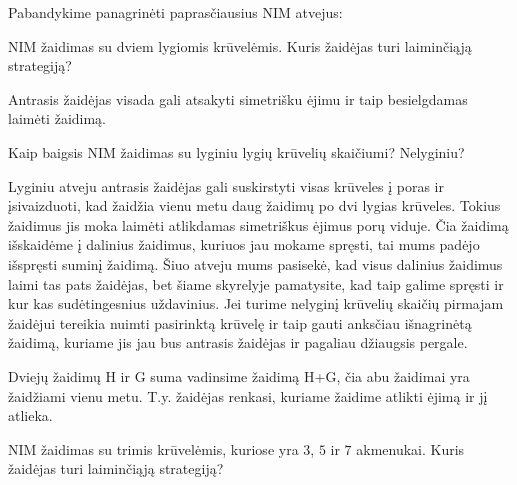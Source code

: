 Pabandykime panagrinėti paprasčiausius NIM atvejus:

\begin{pavnr}
NIM žaidimas su dviem lygiomis krūvelėmis. Kuris žaidėjas turi laiminčiąją strategiją?
\end{pavnr}

\begin{sprendimas}
Antrasis žaidėjas visada gali atsakyti simetrišku ėjimu ir taip besielgdamas laimėti žaidimą.
\end{sprendimas}

\begin{pavnr}
 Kaip baigsis NIM žaidimas su lyginiu lygių krūvelių skaičiumi? Nelyginiu? 
\end{pavnr}

\begin{sprendimas}
Lyginiu atveju antrasis žaidėjas gali suskirstyti visas krūveles į poras ir įsivaizduoti, kad žaidžia vienu metu daug žaidimų po dvi lygias krūveles. Tokius žaidimus jis moka laimėti atlikdamas simetriškus ėjimus porų viduje.
Čia žaidimą išskaidėme į dalinius žaidimus, kuriuos jau mokame spręsti, tai mums padėjo išspręsti suminį žaidimą. Šiuo atveju mums pasisekė, kad visus dalinius žaidimus laimi tas pats žaidėjas, bet šiame skyrelyje pamatysite, 
kad taip galime spręsti ir kur kas sudėtingesnius uždavinius. Jei turime nelyginį krūvelių skaičių pirmajam žaidėjui tereikia nuimti pasirinktą krūvelę ir taip gauti anksčiau išnagrinėtą žaidimą, kuriame jis jau bus antrasis žaidėjas ir pagaliau džiaugsis pergale. 
\end{sprendimas}

\begin{api}
 Dviejų žaidimų H ir G suma vadinsime žaidimą H+G, čia abu žaidimai yra žaidžiami vienu metu. T.y. žaidėjas renkasi, kuriame žaidime atlikti ėjimą ir jį atlieka.  
\end{api}

\begin{pavnr}
  NIM žaidimas su trimis krūvelėmis, kuriose yra $3$, $5$ ir $7$ akmenukai. Kuris
  žaidėjas turi laiminčiąją strategiją?
\end{pavnr}

